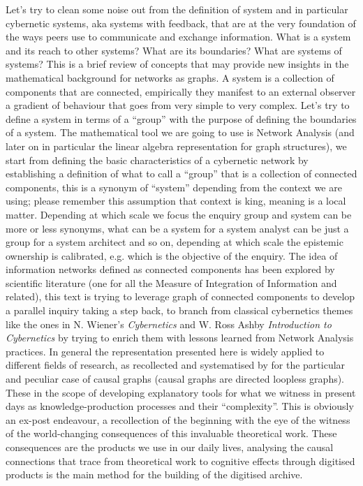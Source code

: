 \documentclass[14pt,a4paper]{extarticle}
\begin{document}
\hspace*{15mm}Let’s try to clean some noise out from the definition of system and in particular cybernetic systems, aka systems with feedback, that are at the very foundation of the ways peers use to communicate and exchange information. What is a system and its reach to other systems? What are its boundaries? What are systems of systems? This is a brief review of concepts that may provide new insights in the mathematical background for networks as graphs.
\newline
\hspace*{15mm}A system is a collection of components that are connected, empirically they manifest to an external observer a gradient of behaviour that goes from very simple to very complex. Let’s try to define a system in terms of a “group” with the purpose of defining the boundaries of a system. The mathematical tool we are going to use is Network Analysis (and later on in particular the linear algebra representation for graph structures), we start from defining the basic characteristics of a cybernetic network by establishing a definition of what to call a “group” that is a collection of connected components, this is a synonym of “system” depending from the context we are using; please remember this assumption that context is king, meaning is a local matter. Depending at which scale we focus the enquiry group and system can be more or less synonyms, what can be a system for a system analyst can be just a group for a system architect and so on, depending at which scale the epistemic ownership is calibrated, e.g. which is the objective of the enquiry.
\newline
The idea of information networks defined as connected components has been explored by scientific literature (one for all the Measure of Integration of Information \cite{TONONIintegrated} and related), this text is trying to leverage graph of connected components to develop a parallel inquiry taking a step back, to branch from classical cybernetics themes like the ones in N. Wiener's \textit{Cybernetics} and W. Ross Ashby \textit{Introduction to Cybernetics} by trying to enrich them with lessons learned from Network Analysis practices. In general the representation presented here is widely applied to different fields of research, as recollected and systematised by \cite{Pearl2010} for the particular and peculiar case of causal graphs (causal graphs are directed loopless graphs). These in the scope of developing explanatory tools for what we witness in present days as knowledge-production processes and their “complexity”. This is obviously an ex-post endeavour, a recollection of the beginning with the eye of the witness of the world-changing consequences of this invaluable theoretical work. These consequences are the products we use in our daily lives, analysing the causal connections that trace from theoretical work to cognitive effects through digitised products is the main method for the building of the digitised archive.
\end{document}
